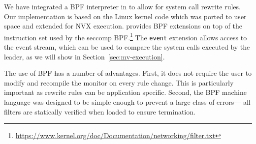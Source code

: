 We have integrated a BPF interpreter in \varan to allow for system
call rewrite rules. Our implementation is based on the Linux kernel
code which was ported to user space and extended for NVX
execution. \varan provides BPF extensions on top of the instruction
set used by the seccomp
BPF.\footnote{\url{https://www.kernel.org/doc/Documentation/networking/filter.txt}}
The \lstinline[language={[bpf]Assembler}]`event` extension allows
access to the event stream, which can be used to compare the system
calls executed by the leader, as we will show in
Section~\ref{sec:mv-execution}.




The use of BPF has a number of advantages.  First, it does not require
the user to modify and recompile the monitor on every rule
change. This is particularly important as rewrite rules can 
be application specific. Second, the BPF machine language was
designed to be simple enough to prevent a large class of errors---\eg
all filters are statically verified when loaded to ensure termination.




